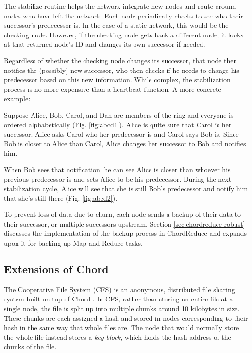The stabilize routine helps the network integrate new nodes and route around nodes who have left the network. 
Each node periodically checks to see who their successor's predecessor is.  In the case of a static network, this would be the checking node.  
However, if the checking node gets back a different node, it looks at that returned node's ID and changes its own successor if needed.  

Regardless of whether the checking node changes its successor, that node then notifies the (possibly) new successor,  who then checks if he needs to change his predecessor based on this new information.  
While complex, the stabilization process is no more expensive than a heartbeat function.  A more concrete example:

Suppose Alice, Bob, Carol, and Dan are members of the ring and everyone is ordered alphabetically (Fig. \ref{fig:abcd1}). 
Alice is quite sure that Carol is her successor.  
Alice asks Carol who her predecessor is and Carol says Bob is.  
Since Bob is closer to Alice than Carol, Alice changes her successor to Bob and notifies him.  

When Bob sees that notification, he can see Alice is closer than whoever his previous predecessor is and sets Alice to be his predecessor.  
During the next stabilization cycle, Alice will see that she is still Bob's predecessor and notify him that she's still there (Fig. \ref{fig:abcd2}).

To prevent loss of data due to churn, each node sends a backup of their data to their successor, or multiple successors upstream.  
Section \ref{sec:chordreduce-robust} discusses the implementation of the backup process in ChordReduce and expands upon it for backing up Map and Reduce tasks.


\subsection{Extensions of Chord}

The Cooperative File System (CFS) is an anonymous, distributed file sharing system built on top of Chord \cite{CFS}.  
In CFS, rather than storing an entire file at a single node, the file is split up into multiple chunks around 10 kilobytes in size.
These chunks are each assigned a hash and stored in nodes corresponding to their hash in the same way that whole files are.  
The node that would normally store the whole file instead stores a \emph{key block}, which holds the hash address of the chunks of the file. 

